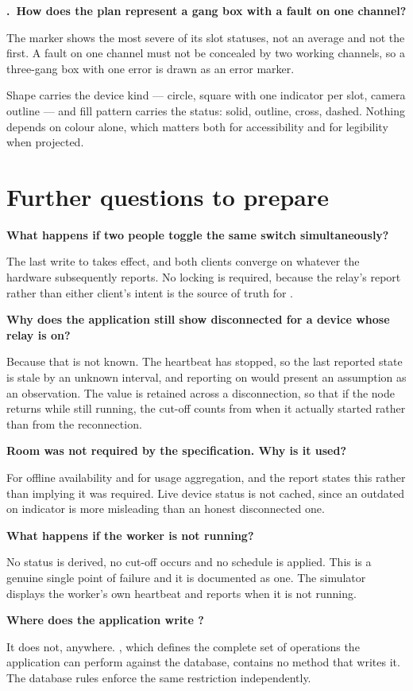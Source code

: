 \documentclass[11pt,a4paper]{article}
\newcounter{qnum}[section]
\newcommand{\question}[1]{%
  \refstepcounter{qnum}%
  \par\vspace{0.9em}%
  \noindent\textbf{\theqnum.\ #1}\par\vspace{0.25em}%
}
\newcommand{\shared}[1]{%
  \par\vspace{0.7em}\noindent\textbf{#1}\par\vspace{0.25em}%
}
\begin{document}
\question{How does the plan represent a gang box with a fault on one channel?}

The marker shows the most severe of its slot statuses, not an average and not
the first. A fault on one channel must not be concealed by two working channels,
so a three-gang box with one error is drawn as an error marker.

Shape carries the device kind --- circle, square with one indicator per slot,
camera outline --- and fill pattern carries the status: solid, outline, cross,
dashed. Nothing depends on colour alone, which matters both for accessibility
and for legibility when projected.

\newpage
\section{Further questions to prepare}

\shared{What happens if two people toggle the same switch simultaneously?}

The last write to  takes effect, and both clients converge on
whatever the hardware subsequently reports. No locking is required, because the
relay's report rather than either client's intent is the source of truth for
.

\shared{Why does the application still show disconnected for a device whose
relay is on?}

Because that is not known. The heartbeat has stopped, so the last reported state
is stale by an unknown interval, and reporting on would present an assumption as
an observation. The  value is retained across a disconnection, so
that if the node returns while still running, the cut-off counts from when it
actually started rather than from the reconnection.

\shared{Room was not required by the specification. Why is it used?}

For offline availability and for usage aggregation, and the report states this
rather than implying it was required. Live device status is not cached, since an
outdated on indicator is more misleading than an honest disconnected one.

\shared{What happens if the worker is not running?}

No status is derived, no cut-off occurs and no schedule is applied. This is a
genuine single point of failure and it is documented as one. The simulator
displays the worker's own heartbeat and reports when it is not running.

\shared{Where does the application write ?}

It does not, anywhere. , which defines the complete set of
operations the application can perform against the database, contains no method
that writes it. The database rules enforce the same restriction independently.
\end{document}
